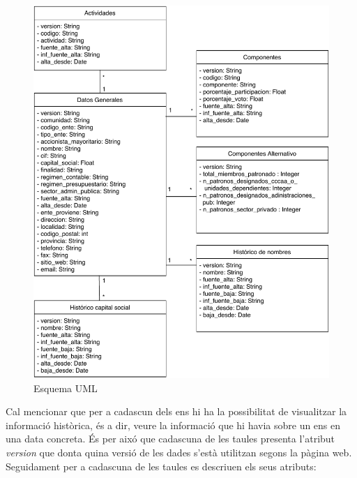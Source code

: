\documentclass[12pt]{article}
\begin{document}
\begin{figure}[H]
    \centering
    \includegraphics[width=0.7\columnwidth]{img/UML.pdf}
    \caption{Esquema UML} 
    \label{UML}
\end{figure}


Cal mencionar que per a cadascun dels ens hi ha la possibilitat de visualitzar la informació històrica, és a dir, veure la informació que hi havia sobre un ens en una data concreta. És per aixó que cadascuna de les taules presenta l'atribut \textit{version} que donta quina versió de les dades s'està utilitzan segons la pàgina web.
Seguidament per a cadascuna de les taules es descriuen els seus atributs:
\end{document}
